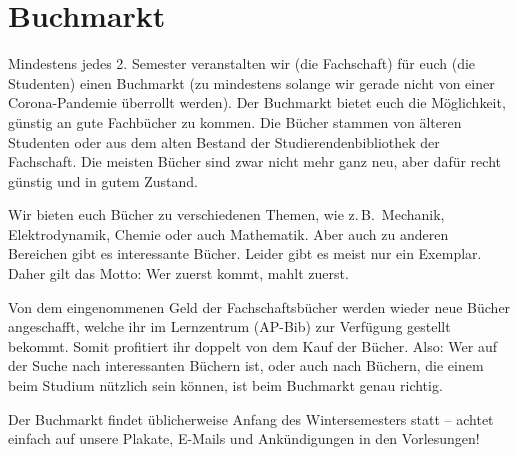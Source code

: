 \vspace{-5ex}
\section{Buchmarkt}
\begin{multicols*}{2}
\begin{wrapfigure}[12]{r}{0cm}
\end{wrapfigure}
Mindestens jedes 2. Semester veranstalten wir (die Fachschaft) für euch (die Studenten) einen Buchmarkt (zu mindestens solange wir gerade nicht von einer Corona-Pandemie überrollt werden).
Der Buchmarkt bietet euch die Möglichkeit, günstig an gute Fachbücher zu kommen.
Die Bücher stammen von älteren Studenten oder aus dem alten Bestand der Studierendenbibliothek der Fachschaft.
Die meisten Bücher sind zwar nicht mehr ganz neu, aber dafür recht günstig und in gutem Zustand.

Wir bieten euch Bücher zu verschiedenen Themen, wie z.\,B.\ Mechanik, Elektrodynamik, Chemie oder auch Mathematik.
Aber auch zu anderen Bereichen gibt es interessante Bücher.
Leider gibt es meist nur ein Exemplar.
Daher gilt das Motto: Wer zuerst kommt, mahlt zuerst.

Von dem eingenommenen Geld der Fachschaftsbücher werden wieder neue Bücher angeschafft, welche ihr im Lernzentrum (AP-Bib) zur Verfügung gestellt bekommt.
Somit profitiert ihr doppelt von dem Kauf der Bücher.
Also: Wer auf der Suche nach interessanten Büchern ist, oder auch nach Büchern, die einem beim Studium nützlich sein können, ist beim Buchmarkt genau richtig.

Der Buchmarkt findet üblicherweise Anfang des Wintersemesters statt -- achtet einfach auf unsere Plakate, E-Mails und Ankündigungen in den Vorlesungen!

\end{multicols*}

